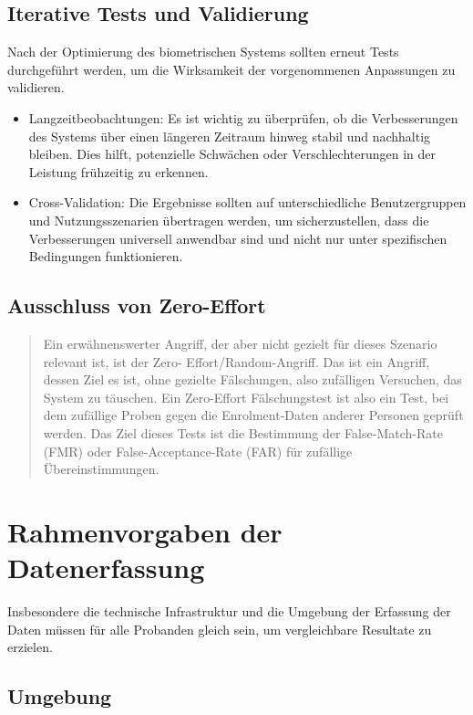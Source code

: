 \documentclass{article}
\begin{document}
\subsection{Iterative Tests und Validierung}

Nach der Optimierung des biometrischen Systems sollten erneut Tests durchgeführt werden, um die Wirksamkeit der vorgenommenen Anpassungen zu validieren.

\begin{itemize}
	\item Langzeitbeobachtungen: Es ist wichtig zu überprüfen, ob die Verbesserungen des Systems über einen
		längeren Zeitraum hinweg stabil und nachhaltig bleiben. Dies hilft, potenzielle Schwächen oder
		Verschlechterungen in der Leistung frühzeitig zu erkennen.
	\item Cross-Validation: Die Ergebnisse sollten auf unterschiedliche Benutzergruppen und Nutzungsszenarien
		übertragen werden, um sicherzustellen, dass die Verbesserungen universell anwendbar sind und
		nicht nur unter spezifischen Bedingungen funktionieren.
\end{itemize}

\subsection*{Ausschluss von Zero-Effort}

\begin{quote}
	Ein erwähnenswerter Angriff, der aber nicht gezielt für dieses Szenario relevant ist, ist der Zero-
	Effort/Random-Angriff. Das ist ein Angriff, dessen Ziel es ist, ohne gezielte Fälschungen, also 
	zufälligen Versuchen, das System zu täuschen. Ein Zero-Effort Fälschungstest ist also ein Test, bei 
	dem zufällige Proben gegen die Enrolment-Daten anderer Personen geprüft werden. Das Ziel dieses Tests 
	ist die Bestimmung der False-Match-Rate (FMR) oder False-Acceptance-Rate (FAR) für zufällige 
	Übereinstimmungen.	
\end{quote}

\section{Rahmenvorgaben der Datenerfassung}

Insbesondere die technische Infrastruktur und die Umgebung der Erfassung der Daten müssen für alle Probanden
gleich sein, um vergleichbare Resultate zu erzielen.

\subsection{Umgebung}
\end{document}
